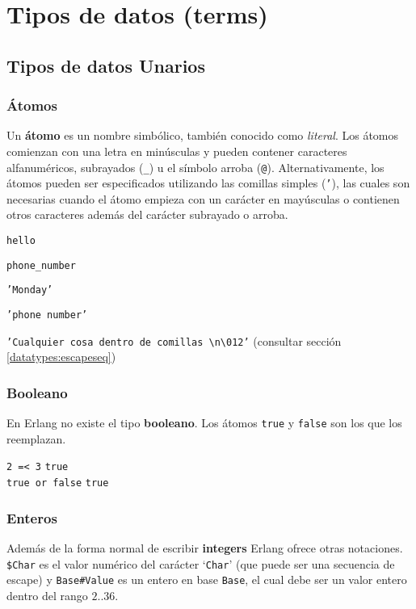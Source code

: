 \chapter{Tipos de datos (terms)}
\label{datatypes}

\section{Tipos de datos Unarios}

\subsection{\'Atomos}
\label{datatypes:atom}
Un \textbf{\'atomo} es un nombre simb\'olico, tambi\'en conocido como \textit{literal}. Los \'atomos comienzan con una letra en min\'usculas y pueden contener caracteres alfanum\'ericos, subrayados (\texttt{\_}) u el s\'imbolo arroba (\texttt{@}).
Alternativamente, los \'atomos pueden ser especificados utilizando las comillas simples (\texttt{'}), las cuales son necesarias cuando el \'atomo empieza con un car\'acter en may\'usculas o contienen otros caracteres adem\'as del car\'acter subrayado o arroba.

\texttt{hello}

\texttt{phone\_number}

\texttt{'Monday'}

\texttt{'phone number'}

\texttt{'Cualquier cosa dentro de comillas \textbackslash n\textbackslash 012'}
\hfill(consultar secci\'on \ref{datatypes:escapeseq})


\subsection{Booleano}
\label{datatypes:boolean}
En Erlang no existe el tipo \textbf{booleano}. Los \'atomos \texttt{true} y \texttt{false} son los que los reemplazan.

\texttt{2 =< 3} \resultingin \texttt{true} \\
\texttt{true or false} \resultingin \texttt{true}

\subsection{Enteros}
\label{datatypes:integer}
Adem\'as de la forma normal de escribir \textbf{integers} Erlang
ofrece otras notaciones. \texttt{\$Char} es el valor num\'erico del car\'acter
`\texttt{Char}' (que puede ser una secuencia de escape) y \texttt{Base\#Value} es un entero en base \texttt{Base}, el cual debe ser un valor entero dentro del rango $2..36$.

